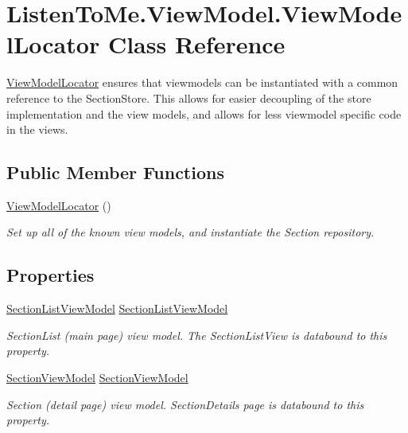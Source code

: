 \hypertarget{class_listen_to_me_1_1_view_model_1_1_view_model_locator}{}\section{Listen\+To\+Me.\+View\+Model.\+View\+Model\+Locator Class Reference}
\label{class_listen_to_me_1_1_view_model_1_1_view_model_locator}


\hyperlink{class_listen_to_me_1_1_view_model_1_1_view_model_locator}{View\+Model\+Locator} ensures that viewmodels can be instantiated with a common reference to the Section\+Store. This allows for easier decoupling of the store implementation and the view models, and allows for less viewmodel specific code in the views.  


\subsection*{Public Member Functions}
\begin{DoxyCompactItemize}
\item 
\hyperlink{class_listen_to_me_1_1_view_model_1_1_view_model_locator_a50210a77a76da746801409d1787c1660}{View\+Model\+Locator} ()
\begin{DoxyCompactList}\small\item\em Set up all of the known view models, and instantiate the Section repository. \end{DoxyCompactList}\end{DoxyCompactItemize}
\subsection*{Properties}
\begin{DoxyCompactItemize}
\item 
\hyperlink{class_listen_to_me_1_1_view_model_1_1_section_list_view_model}{Section\+List\+View\+Model} \hyperlink{class_listen_to_me_1_1_view_model_1_1_view_model_locator_afc24088b98a0ad7f3b8e7f1afd70b80f}{Section\+List\+View\+Model}
\begin{DoxyCompactList}\small\item\em Section\+List (main page) view model. The Section\+List\+View is databound to this property. \end{DoxyCompactList}\item 
\hyperlink{class_listen_to_me_1_1_view_model_1_1_section_view_model}{Section\+View\+Model} \hyperlink{class_listen_to_me_1_1_view_model_1_1_view_model_locator_ac631670f442882ee7070273fb72d48d1}{Section\+View\+Model}
\begin{DoxyCompactList}\small\item\em Section (detail page) view model. Section\+Details page is databound to this property. \end{DoxyCompactList}\end{DoxyCompactItemize}


